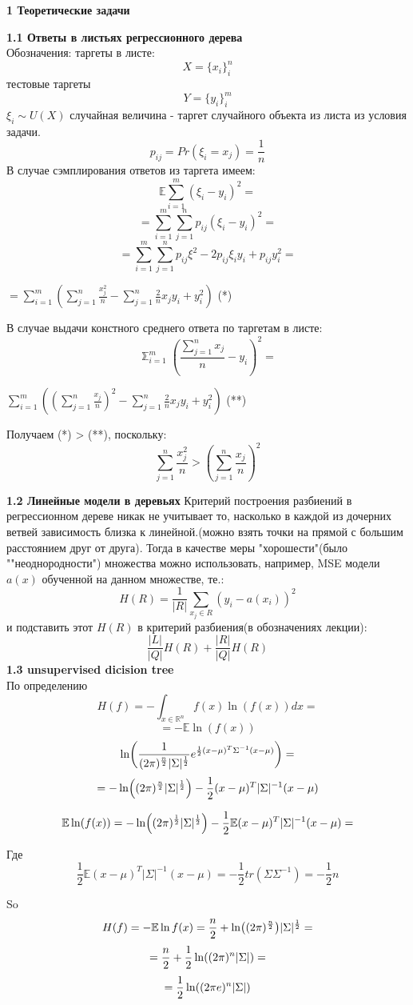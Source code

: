\documentclass[11pt,a4paper]{article}
\newcommand{\lnb}[1]{%
  \ln\mleft(#1\mright)%
}
\begin{document}
\begin{center}
\Huge {
\noindent
\textbf{1 Теоретические задачи}
}
\end{center}

\Large {
\textbf {1.1 Ответы в листьях регрессионного дерева}
}
\\
Обозначения:
таргеты в листе:
$$ X = \{x_i\}_i^n $$
тестовые таргеты
$$ Y = \{y_i\}_i^m $$
$\xi_i \sim U(X)$ случайная величина - таргет случайного объекта из листа из условия задачи.
$$ p_{ij} = Pr(\xi_i = x_j) = \frac{1}{n}$$
В случае сэмплирования ответов из таргета имеем:
\\
$$\mathbb{E} \sum_{i=1}^m (\xi_i - y_i)^2 =$$
$$ = \sum_{i=1}^m \sum_{j=1}^n p_{ij} (\xi_i - y_i)^2 =$$
$$ = \sum_{i=1}^m \sum_{j=1}^n p_{ij} \xi^2 - 2p_{ij} \xi_i y_i + p_{ij}y_i^2 = $$
\begin{center}
$ = \sum_{i=1}^m( \sum_{j=1}^n {\frac{x_j^2}{n}} - \sum_{j=1}^n \frac{2}{n} x_j y_i + y_i^2)$ (*)
\end{center}
В случае выдачи констного среднего ответа по таргетам в листе:
\\
$$ \mathbb \sum_{i=1}^m (\frac{\sum_{j=1}^n x_j}{n} - y_i)^2 = $$
\begin{center}
$ \sum_{i=1}^m ( (\sum_{j=1}^n \frac{x_j}{n})^2 - \sum_{j=1}^n \frac{2}{n} x_j y_i + y_i^2)$ (**)
\end{center}
Получаем (*) > (**), поскольку:
$$ \sum_{j=1}^n \frac{x_j^2}{n} > (\sum_{j=1}^n \frac{x_j}{n})^2 $$

\Large {
\textbf {1.2 Линейные модели в деревьях}
}
Критерий построения разбиений в регрессионном дереве никак не учитывает то, насколько в каждой из дочерних ветвей зависимость близка к линейной.(можно взять точки на прямой с большим расстоянием друг от друга).
Тогда в качестве меры "хорошести"(было ""неоднородности") множества можно использовать, например, MSE модели $a(x)$ обученной на данном множестве, те.:
$$ H(R) = \frac{1}{|R|} \sum_{x_j \in R}(y_i - a(x_i))^2 $$
и подставить этот $H(R)$ в критерий разбиения(в обозначениях лекции):
$$ \frac{|L|}{|Q|} H(R) + \frac{|R|}{|Q|} H(R) $$
\Large {
\textbf {1.3 unsupervised dicision tree}
}
\\
По определению $$H(f) = -\int_{x \in \mathbb{R}^n}^{} f(x) \ln(f(x))dx = $$
$$ = -\mathbb{E}\ln(f(x)) $$
$$ \lnb{\frac{1}{(2\pi)^{\frac{n}{2}} |\Sigma|^{\frac{1}{2}} } e^{ \frac{1}{2} (x - \mu)^T \Sigma^{-1} (x-\mu) }} = $$
$$ = -\lnb{(2\pi)^{\frac{n}{2}} |\Sigma|^{\frac{1}{2}}} - \frac{1}{2} (x - \mu)^T |\Sigma|^{-1} (x - \mu)$$

$$ \mathbb{E} \lnb{f(x)} = -\lnb{(2\pi)^{\frac{1}{2}} |\Sigma|^{\frac{1}{2}}} - \frac{1}{2} \mathbb{E} (x-\mu)^T |\Sigma|^{-1} (x - \mu) = $$

Где $$ \frac{1}{2} \mathbb{E} (x-\mu)^T |\Sigma|^{-1} (x - \mu) =  -\frac{1}{2} tr(\Sigma \Sigma^{-1}) = -\frac{1}{2}n$$

So
$$ H(f) =  -\mathbb{E}\ln f(x)  = \frac{n}{2} + \lnb{(2\pi)^{\frac{n}{2}}} |\Sigma|^{\frac{1}{2}} =$$
$$ = \frac{n}{2} + \frac{1}{2} \lnb {(2\pi)^n |\Sigma|} = $$
$$ = \frac{1}{2} \lnb{(2\pi e)^n |\Sigma|} $$
\end{document}
